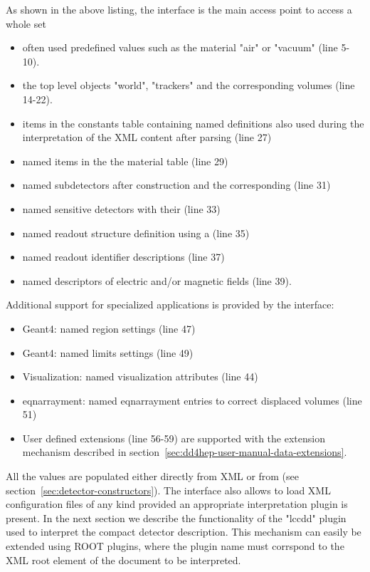 \documentclass[10pt,a4paper]{article}
\begin{document}
\noindent
As shown in the above listing, the  interface is the main access point to access
a whole set 
\begin{itemize}\itemcompact
\item often used predefined values such as the material "air" or "vacuum" (line 5-10).
\item the top level objects "world", "trackers" and the corresponding volumes (line 14-22).
\item items in the constants table containing named definitions also used during the
  interpretation of the XML content after parsing (line 27)
\item named items in the the material table (line 29)
\item named subdetectors after construction and the corresponding (line 31)
\item named sensitive detectors with their (line 33)
\item named readout structure definition using a (line 35)
\item named readout identifier descriptions (line 37)
\item named descriptors of electric and/or magnetic fields  (line 39).
\end{itemize}
Additional support for specialized applications is provided by the interface:
\begin{itemize}\itemcompact
\item Geant4: named region settings  (line 47)
\item Geant4: named limits settings  (line 49)
\item Visualization: named visualization attributes  (line 44)
\item eqnarrayment: named eqnarrayment entries to correct displaced volumes  (line 51)
\item User defined extensions (line 56-59) are supported with the extension mechanism 
    described in section~\ref{sec:dd4hep-user-manual-data-extensions}.
\end{itemize}
All the values are populated either directly from XML or from
 (see section~\ref{sec:detector-constructors}). The interface
also allows to load XML configuration files of any kind provided an appropriate 
interpretation plugin is present. In the next section we describe the functionality 
of the "lccdd" plugin used to interpret the compact detector description.
This mechanism can easily be extended using ROOT plugins, where the 
plugin name must corrspond to the XML root element of the document to 
be interpreted.
\end{document}
